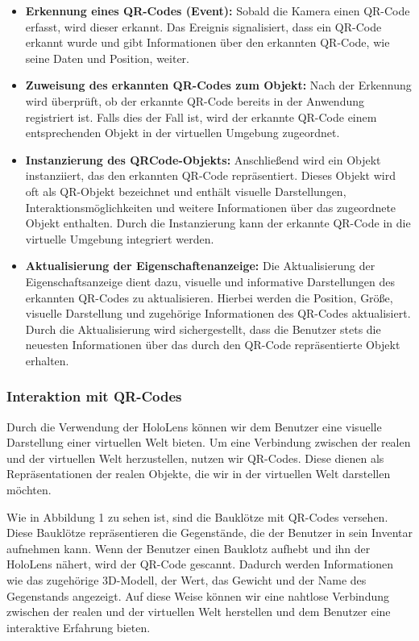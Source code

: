 \begin{itemize}
\item \textbf{Erkennung eines QR-Codes (Event):}
Sobald die Kamera einen QR-Code erfasst, wird dieser erkannt. Das Ereignis signalisiert, dass ein QR-Code erkannt wurde
und gibt Informationen über den erkannten QR-Code, wie seine Daten und Position, weiter.

\item \textbf{Zuweisung des erkannten QR-Codes zum Objekt:}
Nach der Erkennung wird überprüft, ob der erkannte QR-Code bereits in der Anwendung registriert ist. Falls dies der Fall
ist, wird der erkannte QR-Code einem entsprechenden Objekt in der virtuellen Umgebung zugeordnet.

\item \textbf{Instanzierung des QRCode-Objekts:}
Anschließend wird ein Objekt instanziiert, das den erkannten QR-Code repräsentiert. Dieses Objekt wird oft als
QR-Objekt bezeichnet und enthält visuelle Darstellungen, Interaktionsmöglichkeiten und weitere Informationen über das
zugeordnete Objekt enthalten. Durch die Instanzierung kann der erkannte QR-Code in die virtuelle Umgebung integriert werden.

\item \textbf{Aktualisierung der Eigenschaftenanzeige:}
Die Aktualisierung der Eigenschaftsanzeige dient dazu, visuelle und informative Darstellungen des erkannten QR-Codes zu
aktualisieren. Hierbei werden die Position, Größe, visuelle Darstellung und zugehörige Informationen des QR-Codes aktualisiert.
Durch die Aktualisierung wird sichergestellt, dass die Benutzer stets die neuesten Informationen über das durch den QR-Code
repräsentierte Objekt erhalten.

\end{itemize}

\subsubsection{Interaktion mit QR-Codes}
Durch die Verwendung der HoloLens können wir dem Benutzer eine visuelle Darstellung einer virtuellen Welt bieten. Um eine
Verbindung zwischen der realen und der virtuellen Welt herzustellen, nutzen wir QR-Codes.  Diese dienen als Repräsentationen
der realen Objekte, die wir in der virtuellen Welt darstellen möchten.

Wie in Abbildung 1 zu sehen ist, sind die Bauklötze mit QR-Codes versehen. Diese Bauklötze repräsentieren die Gegenstände,
die der Benutzer in sein Inventar aufnehmen kann. Wenn der Benutzer einen Bauklotz aufhebt und ihn der HoloLens nähert, wird
der QR-Code gescannt. Dadurch werden Informationen wie das zugehörige 3D-Modell, der Wert, das Gewicht und der Name des
Gegenstands angezeigt. Auf diese Weise können wir eine nahtlose Verbindung zwischen der realen und der virtuellen Welt
herstellen und dem Benutzer eine interaktive Erfahrung bieten.

